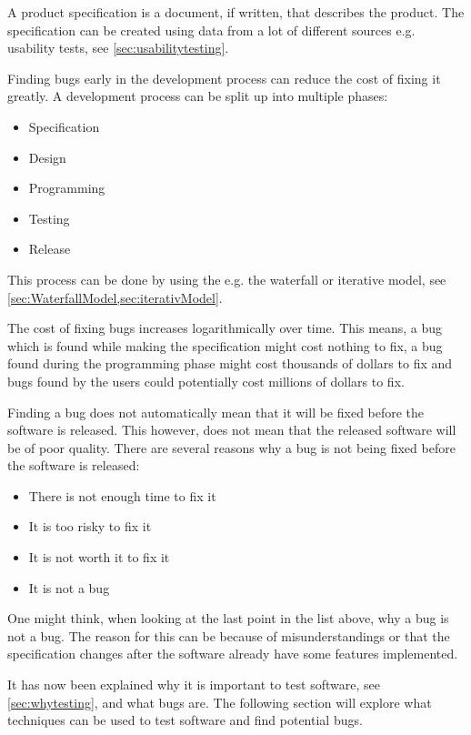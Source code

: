 A product specification is a document, if written, that describes the product.
The specification can be created using data from a lot of different sources e.g. usability tests, see \cref{sec:usabilitytesting}. \cite{SoftwareTesting}

Finding bugs early in the development process can reduce the cost of fixing it greatly.
A development process can be split up into multiple phases:

\begin{itemize}
	\item Specification
	\item Design
	\item Programming
	\item Testing
	\item Release
\end{itemize}

This process can be done by using the e.g. the waterfall or iterative model, see \cref{sec:WaterfallModel,sec:iterativModel}.

The cost of fixing bugs increases logarithmically over time.
This means, a bug which is found while making the specification might cost nothing to fix, a bug found during the programming phase might cost thousands of dollars to fix and bugs found by the users could potentially cost millions of dollars to fix. \cite{SoftwareTesting}


Finding a bug does not automatically mean that it will be fixed before the software is released.
This however, does not mean that the released software will be of poor quality.
There are several reasons why a bug is not being fixed before the software is released: \cite{SoftwareTesting}

\begin{itemize}
	\item There is not enough time to fix it
	\item It is too risky to fix it
	\item It is not worth it to fix it
	\item It is not a bug
\end{itemize}

One might think, when looking at the last point in the list above, why a bug is not a bug.
The reason for this can be because of misunderstandings or that the specification changes after the software already have some features implemented. \cite{SoftwareTesting}

It has now been explained why it is important to test software, see \cref{sec:whytesting}, and what bugs are.
The following section will explore what techniques can be used to test software and find potential bugs.
